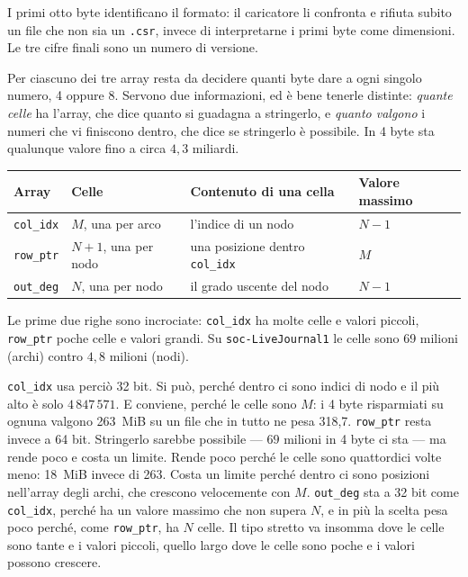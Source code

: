 \documentclass[11pt,a4paper]{article}
\newcommand{\stacco}{\par\medskip\noindent}
\begin{document}
I primi otto byte identificano il formato: il caricatore li confronta e
rifiuta subito un file che non sia un \texttt{.csr}, invece di interpretarne i
primi byte come dimensioni. Le tre cifre finali sono un numero di versione.

\stacco
Per ciascuno dei tre array resta da decidere quanti byte dare a ogni singolo
numero, 4 oppure 8. Servono due informazioni, ed è bene tenerle distinte:
\emph{quante celle} ha l'array, che dice quanto si guadagna a stringerlo, e
\emph{quanto valgono} i numeri che vi finiscono dentro, che dice se stringerlo
è possibile. In 4 byte sta qualunque valore fino a circa $4{,}3$ miliardi.

\begin{center}
\begin{tabular}{@{}llll@{}}
\toprule
\textbf{Array} & \textbf{Celle} & \textbf{Contenuto di una cella} &
\textbf{Valore massimo} \\
\midrule
\texttt{col\_idx} & $M$, una per arco    & l'indice di un nodo
  & $N-1$ \\
\texttt{row\_ptr} & $N{+}1$, una per nodo & una posizione dentro
  \texttt{col\_idx} & $M$ \\
\texttt{out\_deg} & $N$, una per nodo     & il grado uscente del nodo
  & $N-1$ \\
\bottomrule
\end{tabular}
\end{center}

\stacco
Le prime due righe sono incrociate: \texttt{col\_idx} ha molte celle e valori
piccoli, \texttt{row\_ptr} poche celle e valori grandi. Su
\texttt{soc-LiveJournal1} le celle sono 69 milioni (archi)
contro $4{,}8$ milioni (nodi).

\stacco
\texttt{col\_idx} usa perciò 32 bit. Si può, perché dentro ci sono indici di
nodo e il più alto è solo $4\,847\,571$. E conviene, perché le celle sono $M$: i 4 byte
risparmiati su ognuna valgono 263~MiB su un file che in tutto ne pesa 318,7.
\texttt{row\_ptr} resta invece a 64 bit. Stringerlo sarebbe possibile
--- $69$ milioni in 4 byte ci sta --- ma rende poco e costa un limite. Rende
poco perché le celle sono quattordici volte meno: 18~MiB invece di 263. Costa
un limite perché dentro ci sono posizioni nell'array degli archi, che crescono
velocemente con $M$. \texttt{out\_deg} sta a 32 bit come \texttt{col\_idx},
perché ha un valore massimo che non supera $N$, e in più la scelta pesa poco
perché, come \texttt{row\_ptr}, ha $N$ celle. Il tipo stretto va insomma dove le celle
sono tante e i valori piccoli, quello largo dove le celle sono poche e i
valori possono crescere.
\end{document}
